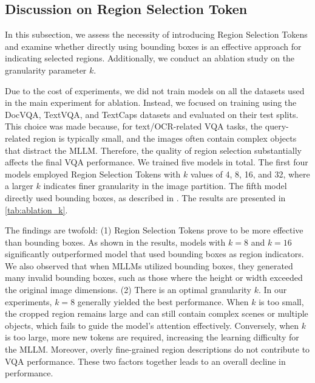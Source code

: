 \subsection{Discussion on Region Selection Token}
In this subsection, we assess the necessity of introducing Region Selection Tokens and examine whether directly using bounding boxes is an effective approach for indicating selected regions. Additionally, we conduct an ablation study on the granularity parameter $k$.

Due to the cost of experiments, we did not train models on all the datasets used in the main experiment for ablation. Instead, we focused on training using the DocVQA, TextVQA, and TextCaps datasets and evaluated on their test splits. This choice was made because, for text/OCR-related VQA tasks, the query-related region is typically small, and the images often contain complex objects that distract the MLLM.  Therefore, the quality of region selection substantially affects the final VQA performance. 
We trained five models in total. The first four models employed Region Selection Tokens with $k$ values of 4, 8, 16, and 32, where a larger $k$ indicates finer granularity in the image partition. The fifth model directly used bounding boxes, as described in \cite{shao2024visual}. The results are presented in \cref{tab:ablation_k}. 

The findings are twofold: (1) Region Selection Tokens prove to be more effective than bounding boxes. As shown in the results, models with $k=8$ and $k=16$ significantly outperformed model that used bounding boxes as region indicators. We also observed that when MLLMs utilized bounding boxes, they generated many invalid bounding boxes, such as those where the height or width exceeded the original image dimensions.
(2) There is an optimal granularity $k$. In our experiments, $k=8$ generally yielded the best performance. When $k$ is too small, the cropped region remains large and can still contain complex scenes or multiple objects, which fails to guide the model's attention effectively. Conversely, when $k$ is too large, more new tokens are required, increasing the learning difficulty for the MLLM. Moreover, overly fine-grained region descriptions do not contribute to VQA performance. These two factors together leads to an overall decline in performance.

